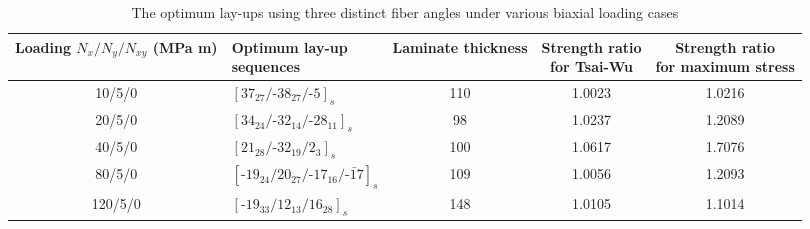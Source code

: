 \begin{table*}[p]
\centering
\caption{The optimum lay-ups using three distinct fiber angles under various biaxial loading cases}
\label{T300/5308 material properties}
\begin{adjustbox}{width=1\textwidth}
\begin{tabular}{clccc}
	\toprule
	\textbf{Loading} $N_{x}/N_{y}/N_{xy}$ \textbf{(MPa m)}   &
	\makecell{\textbf{Optimum lay-up } \\ \textbf{sequences}  }                        &
	\textbf{Laminate thickness} &  \makecell{\textbf{Strength ratio} \\
	\textbf{for Tsai-Wu}}  &
	\makecell{\textbf{Strength ratio} \\ \textbf{for maximum stress}}
	 \\
	\midrule
	10/5/0                       &  $[37_{27}/\text{-}38_{27}/\text{-}5]_s$            &     110      &  1.0023 & 1.0216\\
	20/5/0                       &  $[34_{24}/\text{-}32_{14}/\text{-}28_{11}]_s$      &     98       &  1.0237 & 1.2089 \\
	40/5/0                       &  $[21_{28}/\text{-}32_{19}/2_3]_s$                  &     100      &  1.0617 & 1.7076\\
	80/5/0                       &  $[\text{-}19_{24}/20_{27}/\text{-}{17}_{16}/\bar{\text{-}17}]_s$  &  109      &  1.0056 & 1.2093 \\
	120/5/0                      &  $[\text{-}19_{33}/12_{13}/16_{28}]_s$              &     148      &  1.0105 &  1.1014\\
	\bottomrule
\end{tabular}
\end{adjustbox}
\end{table*}

